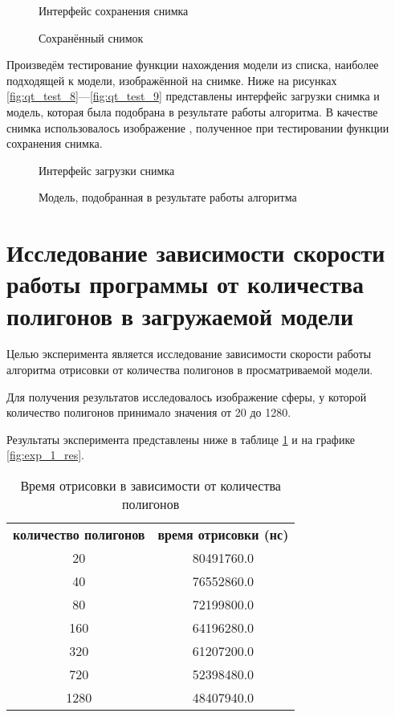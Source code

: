 \begin{figure}[H]
	\caption{Интерфейс сохранения снимка}
	\label{fig:qt_test_5}
\end{figure}

\begin{figure}[H]
	\caption{Сохранённый снимок}
	\label{fig:qt_test_6}
\end{figure}

Произведём тестирование функции нахождения модели из списка, наиболее подходящей к модели, изображённой на снимке. Ниже на рисунках \ref{fig:qt_test_8}---\ref{fig:qt_test_9} представлены интерфейс загрузки снимка и модель, которая была подобрана в результате работы алгоритма. В качестве снимка использовалось изображение \label{fig:qt_test_6}, полученное при тестировании функции сохранения снимка.

\begin{figure}[H]
	\caption{Интерфейс загрузки снимка}
	\label{fig:qt_test_5}
\end{figure}

\begin{figure}[H]
	\caption{Модель, подобранная в результате работы алгоритма}
	\label{fig:qt_test_6}
\end{figure}

\section{Исследование зависимости скорости работы программы от количества полигонов в загружаемой модели}
Целью эксперимента является исследование зависимости скорости работы алгоритма отрисовки от количества полигонов в просматриваемой модели.

Для получения результатов исследовалось изображение сферы, у которой количество полигонов принимало значения от 20 до 1280.

Результаты эксперимента представлены ниже в таблице \ref{tab:res_1} и на графике \ref{fig:exp_1_res}.

\begin{table}[H]
  \begin{center}
    \captionsetup{justification=raggedright}
     \caption{Время отрисовки в зависимости от количества полигонов}
    \label{tab:res_1}
    \begin{tabular}{c|c}
      \textbf{количество полигонов} & \textbf{время отрисовки (нс)}\\
	20 & 80491760.0\\
	40 & 76552860.0\\
	80 & 72199800.0\\
	160 & 64196280.0\\
	320 & 61207200.0\\
	720 & 52398480.0\\
	1280 & 48407940.0\\
      \hline	
    \end{tabular}
  \end{center}
\end{table}

